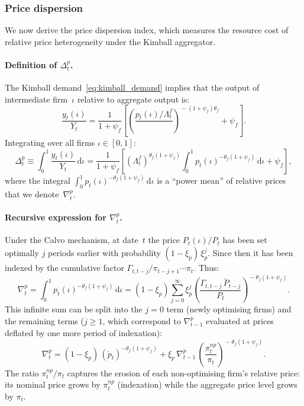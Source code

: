 \documentclass[11pt,a4paper]{article}
\newcommand{\dd}{\mathrm{d}}
\begin{document}
\subsubsection{Price dispersion}

We now derive the price dispersion index, which measures the resource
cost of relative price heterogeneity under the Kimball aggregator.

\paragraph{Definition of $\Delta^p_t$.}
The Kimball demand~\eqref{eq:kimball_demand} implies that the output
of intermediate firm~$\iota$ relative to aggregate output is:
\[
  \frac{y_t(\iota)}{Y_t}
  = \frac{1}{1+\psi_f}
  \left[\left(\frac{p_t(\iota)/\Lambda^f_t}{}\right)^{\!-(1+\psi_f)\theta_f}
    + \psi_f\right].
\]
Integrating over all firms $\iota \in [0,1]$:
\begin{equation}\label{eq:deltap_def}
  \Delta^p_t
  \equiv \int_0^1 \frac{y_t(\iota)}{Y_t}\,\dd\iota
  = \frac{1}{1+\psi_f}
  \left[(\Lambda^f_t)^{\theta_f(1+\psi_f)}\!
    \int_0^1 p_t(\iota)^{-\theta_f(1+\psi_f)}\,\dd\iota
    + \psi_f\right],
\end{equation}
where the integral $\int_0^1 p_t(\iota)^{-\theta_f(1+\psi_f)}\,\dd\iota$
is a ``power mean'' of relative prices that we
denote~$\nabla^p_t$.

\paragraph{Recursive expression for $\nabla^p_t$.}
Under the Calvo mechanism, at date~$t$ the price $P_t(\iota)/P_t$ has
been set optimally $j$ periods earlier with probability
$(1-\xi_p)\,\xi_p^j$. Since then it has been indexed by the cumulative
factor $\Gamma_{t,t-j}/\pi_{t-j+1}\cdots\pi_t$. Thus:
\[
  \nabla^p_t
  = \int_0^1 p_t(\iota)^{-\theta_f(1+\psi_f)}\,\dd\iota
  = (1-\xi_p)\sum_{j=0}^{\infty}\xi_p^j
    \left(\frac{\Gamma_{t,t-j}\,\breve P_{t-j}}{P_t}\right)^{\!-\theta_f(1+\psi_f)}.
\]
This infinite sum can be split into the $j=0$ term (newly optimising
firms) and the remaining terms ($j\geq 1$, which correspond to
$\nabla^p_{t-1}$ evaluated at prices deflated by one more period of
indexation):
\begin{equation}\label{eq:eq23}\tag{Eq.~23}
  \boxed{
  \nabla^p_t = (1-\xi_p)\,(\breve p_t)^{-\theta_f(1+\psi_f)}
  + \xi_p\,\nabla^p_{t-1}\,
    \left(\frac{\pi^{np}_t}{\pi_t}\right)^{\!-\theta_f(1+\psi_f)}.}
\end{equation}
The ratio $\pi^{np}_t/\pi_t$ captures the erosion of each
non-optimising firm's relative price: its nominal price grows by
$\pi^{np}_t$ (indexation) while the aggregate price level grows by
$\pi_t$.
\end{document}

